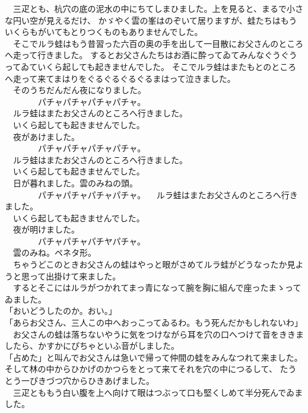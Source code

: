 \documentclass[
a4paper,
book]
{tarticle}
\begin{document}
　三疋とも、杭穴の底の泥水の中にちてしまひました。上を見ると、まるで小さな円い空が見えるだけ、
かゞやく雲の峯はのぞいて居りますが、蛙たちはもういくらもがいてもとりつくものもありませんでした。\\
　そこでルラ蛙はもう昔習った六百の奥の手を出して一目散にお父さんのところへ走って行きました。
するとお父さんたちはお酒に酔ってゐてみんなぐうぐうってゐていくら起しても起きませんでした。
そこでルラ蛙はまたもとのところへ走って来てまはりをぐるぐるぐるぐるまはって泣きました。\\
　そのうちだんだん夜になりました。\\
　　　　パチャパチャパチャパチャ。\\
　ルラ蛙はまたお父さんのところへ行きました。\\
　いくら起しても起きませんでした。\\
　夜があけました。\\
　　　　パチャパチャパチャパチャ。\\
　ルラ蛙はまたお父さんのところへ行きました。\\
　いくら起しても起きませんでした。\\
　日が暮れました。雲のみねの頭。\\
　　　　パチャパチャパチャパチャ。
　ルラ蛙はまたお父さんのところへ行きました。\\
　いくら起しても起きませんでした。\\
　夜が明けました。\\
　　　　パチャパチャパチヤパチャ。\\
　雲のみね。ペネタ形。\\
　ちゃうどこのときお父さんの蛙はやっと眼がさめてルラ蛙がどうなったか見ようと思って出掛けて来ました。\\
　するとそこにはルラがつかれてまっ青になって腕を胸に組んで座ったまゝってゐました。\\
「おいどうしたのか。おい。」\\
「あらお父さん、三人この中へおっこってゐるわ。もう死んだかもしれないわ」\\
　お父さんの蛙は落ちないやうに気をつけながら耳を穴の口へつけて音をききましたら、かすかにぴちゃといふ音がしました。\\
「占めた」と叫んでお父さんは急いで帰って仲間の蛙をみんなつれて来ました。そして林の中からひかげのかつらをとって来てそれを穴の中につるして、
たうとう一ぴきづつ穴からひきあげました。\\
　三疋とももう白い腹を上へ向けて眼はつぶって口も堅くしめて半分死んでゐました。\\
\end{document}
